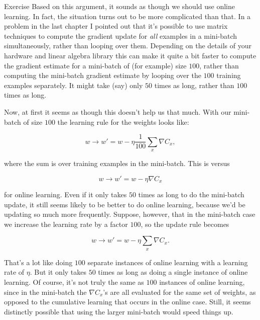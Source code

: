 \begin{exerciseBox}{Exercise}
Based on this argument, it sounds as though we should use online learning. In fact, the situation turns out to be more complicated than that. In a problem in the last chapter I pointed out that it's possible to use matrix techniques to compute the gradient update for \emph{all} examples in a mini-batch simultaneously, rather than looping over them. Depending on the details of your hardware and linear algebra library this can make it quite a bit faster to compute the gradient estimate for a mini-batch of (for example) size $100$, rather than computing the mini-batch gradient estimate by looping over the $100$ training examples separately. It might take (say) only $50$ times as long, rather than $100$ times as long.


Now, at first it seems as though this doesn't help us that much. With our mini-batch of size $100$ the learning rule for the weights looks like:

\begin{equation}
w \rightarrow w' = w-\eta \frac{1}{100} \sum_x \nabla C_x,
\tag{100}
\end{equation}

\noindent where the sum is over training examples in the mini-batch. This is versus

\begin{equation}
w \rightarrow w' = w-\eta \nabla C_x
\tag{101}
\end{equation}

\noindent for online learning. Even if it only takes $50$ times as long to do the mini-batch update, it still seems likely to be better to do online learning, because we'd be updating so much more frequently. Suppose, however, that in the mini-batch case we increase the learning rate by a factor $100$, so the update rule becomes

\begin{equation}
w \rightarrow w' = w-\eta \sum_x \nabla C_x.
\tag{102}
\end{equation}

\noindent That's a lot like doing $100$ separate instances of online learning with a learning rate of $\eta$. But it only takes $50$ times as long as doing a single instance of online learning. Of course, it's not truly the same as $100$ instances of online learning, since in the mini-batch the $\nabla C_x$'s are all evaluated for the same set of weights, as opposed to the cumulative learning that occurs in the online case. Still, it seems distinctly possible that using the larger mini-batch would speed things up.



\end{exerciseBox}
